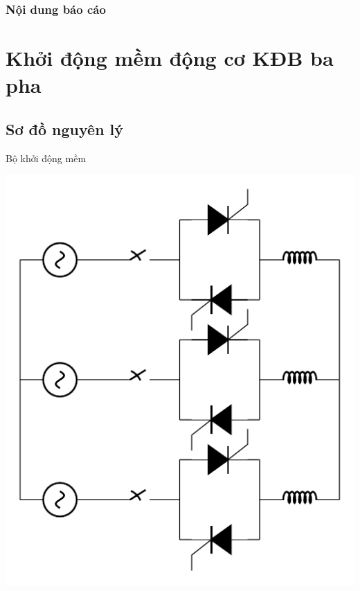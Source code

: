\documentclass[20pt]{beamer}
\begin{document}
\begin{frame}	%
	\frametitle{Nội dung báo cáo}
	\tableofcontents
\end{frame}

\section{Khởi động mềm động cơ KĐB ba pha}
\subsection*{Sơ đồ nguyên lý}
\begin{frame}{Bộ khởi động mềm}
	\vspace{-1.5cm}
	\begin{center}
		\includegraphics[scale=.8,angle=-90]{../sodomach/khoidongmem.pdf} 
	\end{center}
\end{frame}
\end{document}
